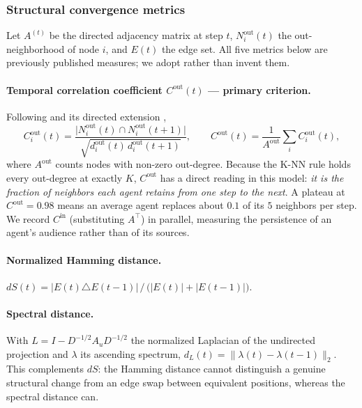 \subsubsection{Structural convergence metrics}
\label{sec:conv-metrics}

Let $A^{(t)}$ be the directed adjacency matrix at step $t$, $N_i^{\mathrm{out}}(t)$ the
out-neighborhood of node $i$, and $E(t)$ the edge set. All five metrics below are
previously published measures; we adopt rather than invent them.

\paragraph{Temporal correlation coefficient $C^{\mathrm{out}}(t)$ --- primary criterion.}
Following \citet{tang2010small} and its directed extension \citep{buttner2016temporal},
\[
C_i^{\mathrm{out}}(t) =
\frac{\bigl|N_i^{\mathrm{out}}(t) \cap N_i^{\mathrm{out}}(t{+}1)\bigr|}
     {\sqrt{d_i^{\mathrm{out}}(t)\, d_i^{\mathrm{out}}(t{+}1)}},
\qquad
C^{\mathrm{out}}(t) = \frac{1}{A^{\mathrm{out}}}\sum_i C_i^{\mathrm{out}}(t),
\]
where $A^{\mathrm{out}}$ counts nodes with non-zero out-degree. Because the K-NN rule
holds every out-degree at exactly $K$, $C^{\mathrm{out}}$ has a direct reading in this
model: \emph{it is the fraction of neighbors each agent retains from one step to the
next}. A plateau at $C^{\mathrm{out}} = 0.98$ means an average agent replaces about
$0.1$ of its $5$ neighbors per step. We record $C^{\mathrm{in}}$ (substituting $A^\top$)
in parallel, measuring the persistence of an agent's audience rather than of its sources.

\paragraph{Normalized Hamming distance.}
$dS(t) = |E(t) \triangle E(t{-}1)| \,/\, \bigl(|E(t)| + |E(t{-}1)|\bigr)$.

\paragraph{Spectral distance.}
With $L = I - D^{-1/2} A_u D^{-1/2}$ the normalized Laplacian of the undirected
projection and $\lambda$ its ascending spectrum,
$d_L(t) = \lVert \lambda(t) - \lambda(t{-}1)\rVert_2$. This complements $dS$: the Hamming
distance cannot distinguish a genuine structural change from an edge swap between
equivalent positions, whereas the spectral distance can.

